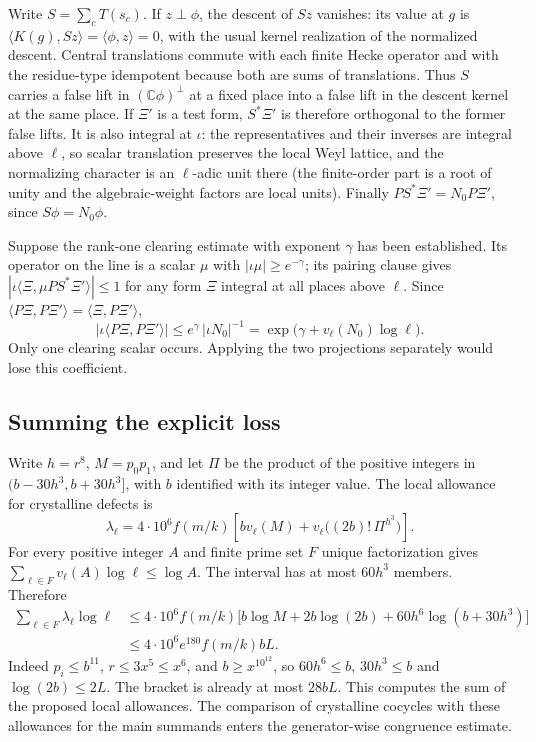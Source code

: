 Write \(S=\sum_c T(s_c)\). If \(z\perp\phi\), the descent of
\(Sz\) vanishes: its value at \(g\) is
\(\langle K(g),Sz\rangle=\langle\phi,z\rangle=0\), with the
usual kernel realization of the normalized descent. Central
translations commute with each finite Hecke operator and with the
residue-type idempotent because both are sums of translations.
Thus \(S\) carries a false lift in \((\mathbb C\phi)^\perp\)
at a fixed place into a false lift in the descent kernel at the same
place. If \(\Xi'\) is a test form, \(S^*\Xi'\) is therefore
orthogonal to the former false lifts. It is also integral at
\(\iota\): the representatives and their inverses are integral
above \(\ell\), so scalar translation preserves the local Weyl
lattice, and the normalizing character is an \(\ell\)-adic
unit there (the finite-order part is a root of unity and the
algebraic-weight factors are local units).
Finally \(PS^*\Xi'=N_0P\Xi'\), since \(S\phi=N_0\phi\).

Suppose the rank-one clearing estimate with exponent \(\gamma\)
has been established. Its operator on the line is a scalar \(\mu\)
with \(|\iota\mu|\ge e^{-\gamma}\); its pairing clause gives
\(|\iota\langle \Xi,\mu P S^*\Xi'\rangle|\le1\) for any form
\(\Xi\) integral at all places above \(\ell\).
Since \(\langle P\Xi,P\Xi'\rangle=\langle\Xi,P\Xi'\rangle\),
\[
 |\iota\langle P\Xi,P\Xi'\rangle|
 \le e^\gamma\,|\iota N_0|^{-1}
 =\exp\bigl(\gamma+v_\ell(N_0)\log\ell\bigr).
\]
Only one clearing scalar occurs. Applying the two projections
separately would lose this coefficient.

\subsection{Summing the explicit loss}
\label{c4:defect-sum}
Write \(h=r^8\), \(M=p_0p_1\), and let \(\Pi\) be the product of the
positive integers in \((b-30h^3,b+30h^3]\), with \(b\) identified
with its integer value. The local allowance for crystalline defects is
\[
 \lambda_\ell=4\cdot10^6 f(m/k)
     \left[bv_\ell(M)+v_\ell\bigl((2b)!\,\Pi^{h^3}\bigr)\right].
\]
For every positive integer \(A\) and finite prime set \(F\) unique
factorization gives \(\sum_{\ell\in F}v_\ell(A)\log\ell\le\log A\).
The interval has at most \(60h^3\) members. Therefore
\begin{align*}
 \sum_{\ell\in F}\lambda_\ell\log\ell
 &\le 4\cdot10^6 f(m/k)
   \bigl[b\log M+2b\log(2b)+60h^6\log(b+30h^3)\bigr]\\
 &\le 4\cdot10^6 e^{180} f(m/k)bL .
\end{align*}
Indeed \(p_i\le b^{11}\), \(r\le3x^5\le x^6\), and
\(b\ge x^{10^{12}}\), so \(60h^6\le b\), \(30h^3\le b\) and
\(\log(2b)\le2L\). The bracket is already at most \(28bL\).
This computes the sum of the proposed local allowances. The
comparison of crystalline cocycles with these allowances for the
main summands enters the generator-wise congruence estimate.

